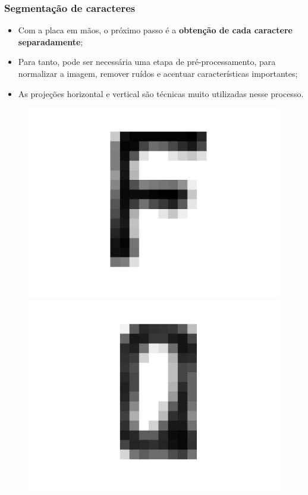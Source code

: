 \begin{frame}
	\frametitle{Segmentação de caracteres}
	\begin{itemize}
	\item Com a placa em mãos, o próximo passo é a \textbf{obtenção de cada 
	caractere separadamente};
	\item Para tanto, pode ser necessária uma etapa
	de pré-processamento, para normalizar a imagem, remover ruídos
	e acentuar características importantes;
	\item As projeções horizontal
	e vertical são técnicas muito utilizadas nesse processo.
	\end{itemize}
	
	\begin{figure}[!tbp]
		\centering
		\begin{minipage}[b]{.3\textwidth}
			\includegraphics[scale=0.15]{img/F.jpg}
		\end{minipage}
		\begin{minipage}[b]{.3\textwidth}
			\includegraphics[scale=0.15]{img/Q.jpg}
		\end{minipage}
	\end{figure}

\end{frame}
